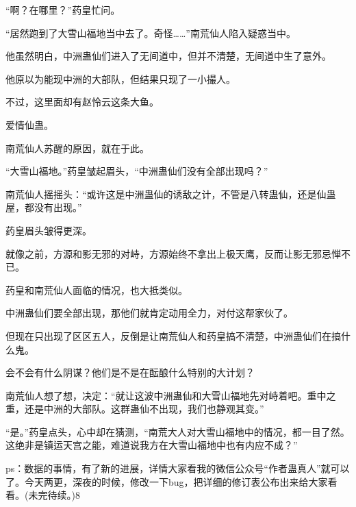 \begin{this_body}
“啊？在哪里？”药皇忙问。

“居然跑到了大雪山福地当中去了。奇怪……”南荒仙人陷入疑惑当中。

他虽然明白，中洲蛊仙们进入了无间道中，但并不清楚，无间道中生了意外。

他原以为能现中洲的大部队，但结果只现了一小撮人。

不过，这里面却有赵怜云这条大鱼。

爱情仙蛊。

南荒仙人苏醒的原因，就在于此。

“大雪山福地。”药皇皱起眉头，“中洲蛊仙们没有全部出现吗？”

南荒仙人摇摇头：“或许这是中洲蛊仙的诱敌之计，不管是八转蛊仙，还是仙蛊屋，都没有出现。”

药皇眉头皱得更深。

就像之前，方源和影无邪的对峙，方源始终不拿出上极天鹰，反而让影无邪忌惮不已。

药皇和南荒仙人面临的情况，也大抵类似。

中洲蛊仙们要全部出现，那他们就肯定动用全力，对付这帮家伙了。

但现在只出现了区区五人，反倒是让南荒仙人和药皇搞不清楚，中洲蛊仙们在搞什么鬼。

会不会有什么阴谋？他们是不是在酝酿什么特别的大计划？

南荒仙人想了想，决定：“就让这波中洲蛊仙和大雪山福地先对峙着吧。重中之重，还是中洲的大部队。这群蛊仙不出现，我们也静观其变。”

“是。”药皇点头，心中却在猜测，“南荒大人对大雪山福地中的情况，都一目了然。这绝非是镇运天宫之能，难道说我方在大雪山福地中也有内应不成？”

ps：数据的事情，有了新的进展，详情大家看我的微信公众号“作者蛊真人”就可以了。今天两更，深夜的时候，修改一下bug，把详细的修订表公布出来给大家看看。(未完待续。)8

\end{this_body}

